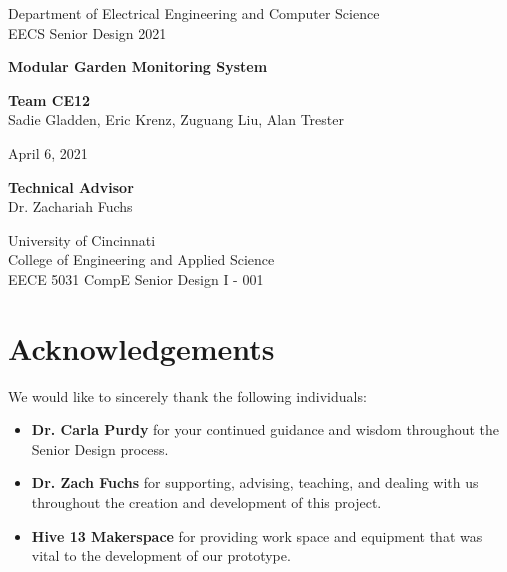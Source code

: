 \documentclass{report}
\begin{document}
\begin{titlepage}
    \begin{center}
        \vspace*{1cm}

        \vspace{1.5cm}
        \Large
        Department of Electrical Engineering and Computer Science\\
        EECS Senior Design 2021

        \Huge
        \textbf{Modular Garden Monitoring System}

        \vspace{1.5cm}

        \textbf{Team CE12} \\
        {\Large Sadie Gladden, Eric Krenz, Zuguang Liu, Alan Trester}

        \vspace{0.5cm}
        \Large
        April 6, 2021

        \vspace{1.5cm}
        \textbf{Technical Advisor} \\
        {\Large Dr. Zachariah Fuchs}

        \vfill
        University of Cincinnati\\
        College of Engineering and Applied Science\\
        EECE 5031 CompE Senior Design I - 001

        \vspace{0.8cm}
    \end{center}
\end{titlepage}

\newpage
\section*{Acknowledgements}
We would like to sincerely thank the following individuals:
\begin{itemize}
    \item
          \textbf{Dr. Carla Purdy} for your continued guidance and wisdom throughout the Senior Design process.
    \item
          \textbf{Dr. Zach Fuchs} for supporting, advising, teaching, and dealing with us throughout the creation and development of this project.
    \item
          \textbf{Hive 13 Makerspace} for providing work space and equipment that was vital to the development of our prototype.
\end{itemize}
\end{document}
